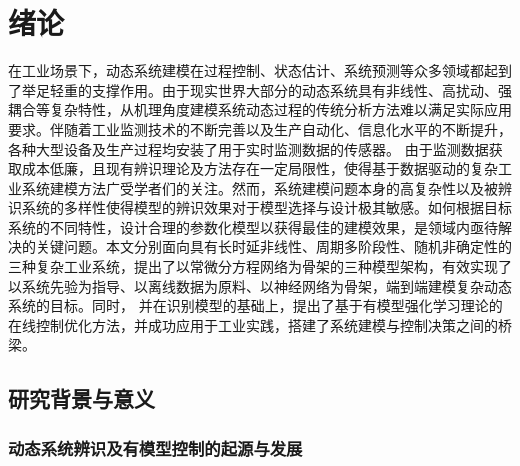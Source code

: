 
\chapter{绪论}

\setcounter{page}{1}
在工业场景下，动态系统建模在过程控制、状态估计、系统预测等众多领域都起到了举足轻重的支撑作用。由于现实世界大部分的动态系统具有非线性、高扰动、强耦合等复杂特性，从机理角度建模系统动态过程的传统分析方法难以满足实际应用要求。伴随着工业监测技术的不断完善以及生产自动化、信息化水平的不断提升，各种大型设备及生产过程均安装了用于实时监测数据的传感器。 由于监测数据获取成本低廉，且现有辨识理论及方法存在一定局限性，使得基于数据驱动的复杂工业系统建模方法广受学者们的关注。然而，系统建模问题本身的高复杂性以及被辨识系统的多样性使得模型的辨识效果对于模型选择与设计极其敏感。如何根据目标系统的不同特性，设计合理的参数化模型以获得最佳的建模效果，是领域内亟待解决的关键问题。本文分别面向具有长时延非线性、周期多阶段性、随机非确定性的三种复杂工业系统，提出了以常微分方程网络为骨架的三种模型架构，有效实现了以系统先验为指导、以离线数据为原料、以神经网络为骨架，端到端建模复杂动态系统的目标。同时，
并在识别模型的基础上，提出了基于有模型强化学习理论的在线控制优化方法，并成功应用于工业实践，搭建了系统建模与控制决策之间的桥梁。
\section{研究背景与意义}
    




\subsection{动态系统辨识及有模型控制的起源与发展}

